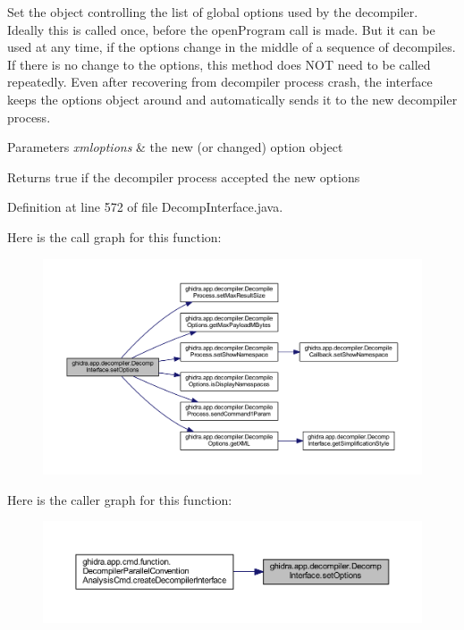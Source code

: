 Set the object controlling the list of global options used by the decompiler. Ideally this is called once, before the open\+Program call is made. But it can be used at any time, if the options change in the middle of a sequence of decompiles. If there is no change to the options, this method does N\+OT need to be called repeatedly. Even after recovering from decompiler process crash, the interface keeps the options object around and automatically sends it to the new decompiler process. 
\begin{DoxyParams}{Parameters}
{\em xmloptions} & the new (or changed) option object \\
\hline
\end{DoxyParams}
\begin{DoxyReturn}{Returns}
true if the decompiler process accepted the new options 
\end{DoxyReturn}


Definition at line 572 of file Decomp\+Interface.\+java.

Here is the call graph for this function\+:
\nopagebreak
\begin{figure}[H]
\begin{center}
\leavevmode
\includegraphics[width=350pt]{classghidra_1_1app_1_1decompiler_1_1_decomp_interface_a1c6be053337ad093e441a722c1b157b9_cgraph}
\end{center}
\end{figure}
Here is the caller graph for this function\+:
\nopagebreak
\begin{figure}[H]
\begin{center}
\leavevmode
\includegraphics[width=350pt]{classghidra_1_1app_1_1decompiler_1_1_decomp_interface_a1c6be053337ad093e441a722c1b157b9_icgraph}
\end{center}
\end{figure}
\mbox{\label{classghidra_1_1app_1_1decompiler_1_1_decomp_interface_a6f21c198b5a43c80122198470b0310a8}} 
